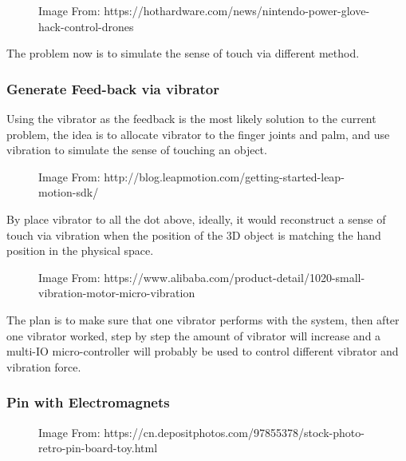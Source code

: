 \documentclass[12pt,a4paper]{report}
\begin{document}
\begin{figure}[H]
    \centering
	\caption{Image From: https://hothardware.com/news/nintendo-power-glove-hack-control-drones}
	\label{fig:full}
\end{figure}

The problem now is to simulate the sense of touch via different method. 

\subsubsection{Generate Feed-back via vibrator}

Using the vibrator as the feedback is the most likely solution to the current problem, the idea is to allocate vibrator to the finger joints and palm, and use vibration to simulate the sense of touching an object. 

\begin{figure}[H]
    \centering
	\caption{Image From: http://blog.leapmotion.com/getting-started-leap-motion-sdk/}
	\label{fig:full}
\end{figure}

By place vibrator to all the dot above, ideally, it would reconstruct a sense of touch via vibration when the position of the 3D object is matching the hand position in the physical space. 

\begin{figure}[H]
    \centering
	\caption{Image From: https://www.alibaba.com/product-detail/1020-small-vibration-motor-micro-vibration}
	\label{fig:full}
\end{figure}

The plan is to make sure that one vibrator performs with the system, then after one vibrator worked, step by step the amount of vibrator will increase and a multi-IO micro-controller will probably be used to control different vibrator and vibration force.    

\subsubsection{Pin with Electromagnets}

\begin{figure}[H]
    \centering
	\caption{Image From: https://cn.depositphotos.com/97855378/stock-photo-retro-pin-board-toy.html}
	\label{fig:full}
\end{figure}
\end{document}
